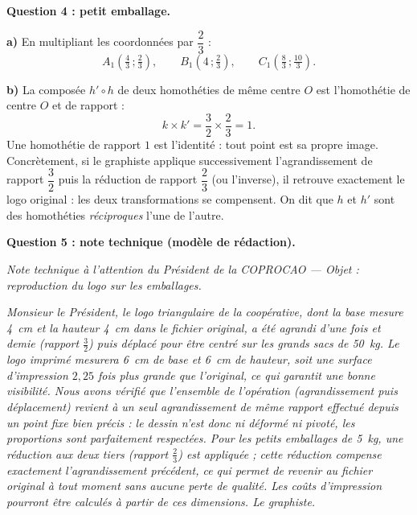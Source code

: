 \documentclass[11pt]{article}
\newcommand{\cle}[1]{{\popxbold\color{popdark}#1}}
\begin{document}
\begin{exoresolu}
\textbf{Question 4 : petit emballage.}

\textbf{a)} En multipliant les coordonnées par $\dfrac{2}{3}$ :
\[ A_1\left(\tfrac{4}{3}\,;\tfrac{2}{3}\right), \qquad B_1\left(4\,;\tfrac{2}{3}\right), \qquad C_1\left(\tfrac{8}{3}\,;\tfrac{10}{3}\right). \]

\textbf{b)} La composée $h' \circ h$ de deux homothéties de même centre $O$ est l'homothétie de centre $O$ et de rapport :
\[ k \times k' = \dfrac{3}{2}\times\dfrac{2}{3} = 1. \]
Une homothétie de rapport $1$ est l'\cle{identité} : tout point est sa propre image. Concrètement, si le graphiste applique successivement l'agrandissement de rapport $\dfrac{3}{2}$ puis la réduction de rapport $\dfrac{2}{3}$ (ou l'inverse), il retrouve exactement le logo original : les deux transformations se compensent. On dit que $h$ et $h'$ sont des homothéties \emph{réciproques} l'une de l'autre.

\textbf{Question 5 : note technique (modèle de rédaction).}

\emph{Note technique à l'attention du Président de la COPROCAO — Objet : reproduction du logo sur les emballages.}

\emph{Monsieur le Président, le logo triangulaire de la coopérative, dont la base mesure \SI{4}{cm} et la hauteur \SI{4}{cm} dans le fichier original, a été agrandi d'une fois et demie (rapport $\frac{3}{2}$) puis déplacé pour être centré sur les grands sacs de \SI{50}{kg}. Le logo imprimé mesurera \SI{6}{cm} de base et \SI{6}{cm} de hauteur, soit une surface d'impression $2{,}25$ fois plus grande que l'original, ce qui garantit une bonne visibilité. Nous avons vérifié que l'ensemble de l'opération (agrandissement puis déplacement) revient à un seul agrandissement de même rapport effectué depuis un point fixe bien précis : le dessin n'est donc ni déformé ni pivoté, les proportions sont parfaitement respectées. Pour les petits emballages de \SI{5}{kg}, une réduction aux deux tiers (rapport $\frac{2}{3}$) est appliquée ; cette réduction compense exactement l'agrandissement précédent, ce qui permet de revenir au fichier original à tout moment sans aucune perte de qualité. Les coûts d'impression pourront être calculés à partir de ces dimensions. Le graphiste.}
\end{exoresolu}
\end{document}

